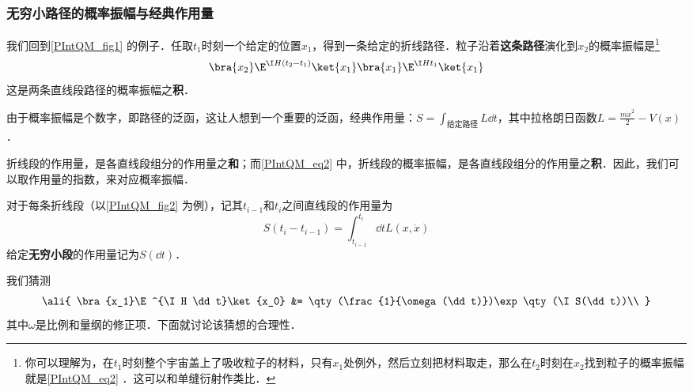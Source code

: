 \subsubsection{无穷小路径的概率振幅与经典作用量}

我们回到\autoref{PIntQM_fig1} 的例子．任取$t_1$时刻一个给定的位置$x_1$，得到一条给定的折线路径．粒子沿着\textbf{这条路径}演化到$x_2$的概率振幅是\footnote{你可以理解为，在$t_1$时刻整个宇宙盖上了吸收粒子的材料，只有$x_1$处例外，然后立刻把材料取走，那么在$t_2$时刻在$x_2$找到粒子的概率振幅就是\autoref{PIntQM_eq2} ．这可以和单缝衍射作类比．}
\begin{equation}\label{PIntQM_eq2}
\bra{x_2}\E^{\I H (t_2-t_1)}\ket{x_1}\bra{x_1}\E^{\I H t_1}\ket{x_1}
\end{equation}
这是两条直线段路径的概率振幅之\textbf{积}．



由于概率振幅是个数字，即路径的泛函，这让人想到一个重要的泛函，经典作用量：$S=\int_{\text{给定路径}}L\dd t$，其中拉格朗日函数$L=\frac{m\dot{x}^2}{2}-V(x)$．

折线段的作用量，是各直线段组分的作用量之\textbf{和}；而\autoref{PIntQM_eq2} 中，折线段的概率振幅，是各直线段组分的作用量之\textbf{积}．因此，我们可以取作用量的指数，来对应概率振幅．

对于每条折线段（以\autoref{PIntQM_fig2} 为例），记其$t_{i-1}$和$t_i$之间直线段的作用量为
\begin{equation}
S(t_{i}-t_{i-1})=\int^{t_i}_{t_{i-1}}\dd t L(x, \dot{x})
\end{equation}
给定\textbf{无穷小段}的作用量记为$S(\dd t)$．

我们猜测
\begin{equation}
\ali{
    \bra{x_1}\E^{\I H \dd t}\ket{x_0} &= \qty(\frac{1}{\omega(\dd t)})\exp\qty(\I S(\dd t))\\
}
\end{equation}
其中$\omega$是比例和量纲的修正项．下面就讨论该猜想的合理性．

